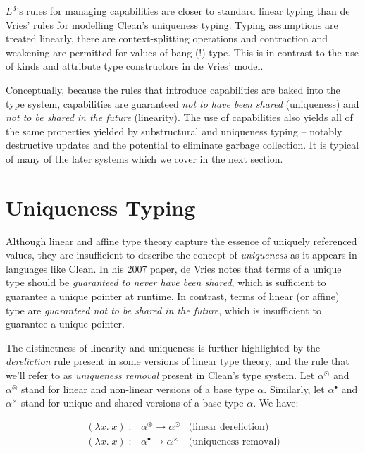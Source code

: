 \documentclass[]{unswthesis}
\let\i\textit
\begin{document}
$L^3$'s rules for managing capabilities are closer to standard linear typing than de Vries' rules for modelling Clean's uniqueness typing. Typing assumptions are treated linearly, there are context-splitting operations and contraction and weakening are permitted for values of bang (!) type. This is in contrast to the use of kinds and attribute type constructors in de Vries' model.

Conceptually, because the rules that introduce capabilities are baked into the type system, capabilities are guaranteed \i{not to have been shared} (uniqueness) and \i{not to be shared in the future} (linearity). The use of capabilities also yields all of the same properties yielded by substructural and uniqueness typing -- notably destructive updates and the potential to eliminate garbage collection. It is typical of many of the later systems which we cover in the next section.

\section{Uniqueness Typing}

Although linear and affine type theory capture the essence of uniquely referenced values, they are insufficient to describe the concept of \i{uniqueness} as it appears in languages like Clean. In his 2007 paper, de Vries \cite{deVries07} notes that terms of a unique type should be \i{guaranteed to never have been shared}, which is sufficient to guarantee a unique pointer at runtime. In contrast, terms of linear (or affine) type are \i{guaranteed not to be shared in the future}, which is insufficient to guarantee a unique pointer.

The distinctness of linearity and uniqueness is further highlighted by the \i{dereliction} rule present in some versions of linear type theory, and the rule that we'll refer to as \i{uniqueness removal} present in Clean's type system. Let $\alpha^\odot$ and $\alpha^\otimes$ stand for linear and non-linear versions of a base type $\alpha$. Similarly, let $\alpha^\bullet$ and $\alpha^\times$ stand for unique and shared versions of a base type $\alpha$. We have:

\begin{eqnarray*}
(\lambda x. \; x) \; : & \alpha^\otimes \rightarrow \alpha^\odot & \text{(linear dereliction)}\\
(\lambda x. \; x) \; : & \alpha^\bullet \rightarrow \alpha^\times & \text{(uniqueness removal)}
\end{eqnarray*}
\end{document}
